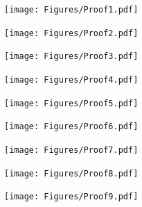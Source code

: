 \documentclass[20pt,usenames,dvipsnames]{beamer}
\begin{document}
\begin{frame}[plain]

\begin{center}
\texttt{[image: Figures/Proof1.pdf]}
\end{center}
\end{frame}

\begin{frame}[plain]
\Large
\begin{center}
\texttt{[image: Figures/Proof2.pdf]}
\end{center}
\end{frame}

\begin{frame}[plain]
\Large
\begin{center}
\texttt{[image: Figures/Proof3.pdf]}
\end{center}
\end{frame}

\begin{frame}[plain]
\Large
\begin{center}
\texttt{[image: Figures/Proof4.pdf]}
\end{center}
\end{frame}

\begin{frame}[plain]
\Large
\begin{center}
\texttt{[image: Figures/Proof5.pdf]}
\end{center}
\end{frame}

\begin{frame}[plain]
\Large
\begin{center}
\texttt{[image: Figures/Proof6.pdf]}
\end{center}
\end{frame}

\begin{frame}[plain]
\Large
\begin{center}
\texttt{[image: Figures/Proof7.pdf]}
\end{center}
\end{frame}

\begin{frame}[plain]
\Large
\begin{center}
\texttt{[image: Figures/Proof8.pdf]}
\end{center}
\end{frame}

\begin{frame}[plain]
\Large
\begin{center}
\texttt{[image: Figures/Proof9.pdf]}
\end{center}
\end{frame}
\end{document}
